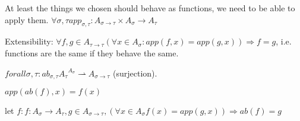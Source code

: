 \documentclass[a4paper,10pt]{book}
\begin{document}
At least the things we chosen should behave as functions, we need to be able to apply them.
$\forall \sigma, \tau app_{\sigma,\tau} : A_{\sigma \rightarrow \tau} \times A_{\sigma} 
\rightarrow A_{\tau}$

Extensibility: $\forall f,g \in A_{\tau \rightarrow \tau} (\forall x \in A_{\sigma}: app(f,x) = app(g,x)) \Rightarrow f = g$, i.e. functions are the same if they behave the same.

$forall \sigma,\tau: ab_{\sigma,\tau} {A_\tau}^{A_\sigma} \rightharpoonup A_{\sigma \rightarrow \tau}$ (surjection).

$app (ab(f), x) = f(x)$

let $f: f: A_{\sigma} \rightarrow A_{\tau}, g \in A_{\sigma \rightarrow \tau}, 
(\forall x \in A_{\sigma} f(x) = app(g,x)) \Rightarrow ab(f) = g$
\end{document}
